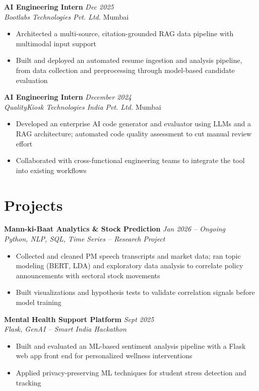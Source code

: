 \documentclass[10.5pt,a4paper]{article}
\newcommand{\entry}[4]{%
  \textbf{#1} \hfill \textit{#2}\\
  \textit{#3} \hfill #4\\[2pt]
}
\begin{document}
\entry{AI Engineering Intern}{Dec 2025}{Bootlabs Technologies Pvt. Ltd.}{Mumbai}
\begin{itemize}
  \item Architected a multi-source, citation-grounded RAG data pipeline with multimodal input support
  \item Built and deployed an automated resume ingestion and analysis pipeline, from data collection and preprocessing through model-based candidate evaluation
\end{itemize}

\entry{AI Engineering Intern}{December 2024}{QualityKiosk Technologies India Pvt. Ltd.}{Mumbai}
\begin{itemize}
  \item Developed an enterprise AI code generator and evaluator using LLMs and a RAG architecture; automated code quality assessment to cut manual review effort
  \item Collaborated with cross-functional engineering teams to integrate the tool into existing workflows
\end{itemize}

\section*{Projects}

\entry{Mann-ki-Baat Analytics \& Stock Prediction}{Jan 2026 -- Ongoing}{Python, NLP, SQL, Time Series -- Research Project}{}
\begin{itemize}
  \item Collected and cleaned PM speech transcripts and market data; ran topic modeling (BERT, LDA) and exploratory data analysis to correlate policy announcements with sectoral stock movements
  \item Built visualizations and hypothesis tests to validate correlation signals before model training
\end{itemize}

\entry{Mental Health Support Platform}{Sept 2025}{Flask, GenAI -- Smart India Hackathon}{}
\begin{itemize}
  \item Built and evaluated an ML-based sentiment analysis pipeline with a Flask web app front end for personalized wellness interventions
  \item Applied privacy-preserving ML techniques for student stress detection and tracking
\end{itemize}
\end{document}
